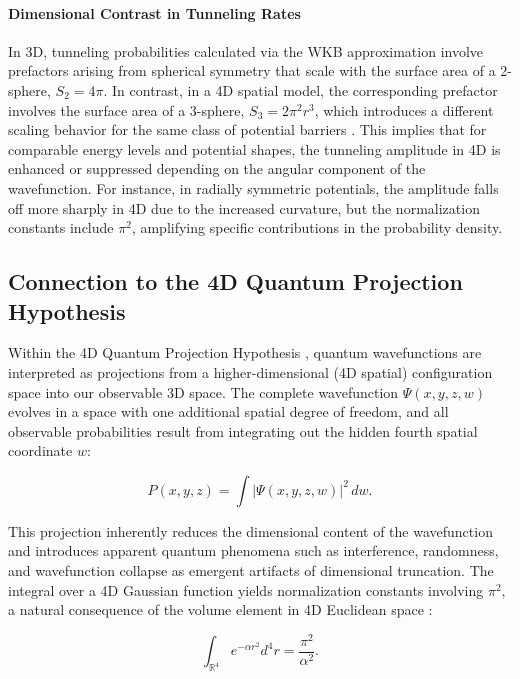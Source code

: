 \documentclass[12pt,a4paper]{article}
\begin{document}
\paragraph{Dimensional Contrast in Tunneling Rates}

In 3D, tunneling probabilities calculated via the WKB approximation involve prefactors arising from spherical symmetry that scale with the surface area of a 2-sphere, \(S_2 = 4\pi\). In contrast, in a 4D spatial model, the corresponding prefactor involves the surface area of a 3-sphere, \(S_3 = 2\pi^2 r^3\), which introduces a different scaling behavior for the same class of potential barriers \cite{quantum-tunneling-pi-specific, caruso_wave_2014}. This implies that for comparable energy levels and potential shapes, the tunneling amplitude in 4D is enhanced or suppressed depending on the angular component of the wavefunction. For instance, in radially symmetric potentials, the amplitude falls off more sharply in 4D due to the increased curvature, but the normalization constants include \(\pi^2\), amplifying specific contributions in the probability density.

\subsection{Connection to the 4D Quantum Projection Hypothesis}

Within the 4D Quantum Projection Hypothesis \cite{4d-quantum-projection}, quantum wavefunctions are interpreted as projections from a higher-dimensional (4D spatial) configuration space into our observable 3D space. The complete wavefunction \(\Psi(x, y, z, w)\) evolves in a space with one additional spatial degree of freedom, and all observable probabilities result from integrating out the hidden fourth spatial coordinate \(w\):

\begin{equation}
P(x, y, z) = \int |\Psi(x, y, z, w)|^2 \, dw.
\end{equation}

This projection inherently reduces the dimensional content of the wavefunction and introduces apparent quantum phenomena such as interference, randomness, and wavefunction collapse as emergent artifacts of dimensional truncation. The integral over a 4D Gaussian function yields normalization constants involving \(\pi^2\), a natural consequence of the volume element in 4D Euclidean space \cite{zeidler_quantum_2009,4d-wave-normalization-specific}:

\begin{equation}
\int_{\mathbb{R}^4} e^{-\alpha r^2} d^4r = \frac{\pi^2}{\alpha^2}.
\end{equation}
\end{document}
